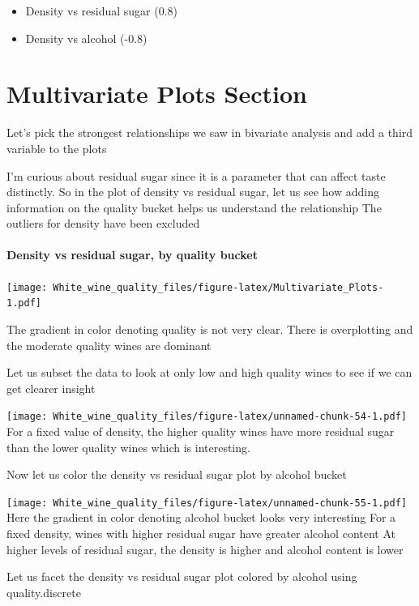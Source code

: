 \documentclass[]{article}
\providecommand{\tightlist}{%
  \setlength{\itemsep}{0pt}\setlength{\parskip}{0pt}}
\let\oldparagraph\paragraph
\renewcommand{\paragraph}[1]{\oldparagraph{#1}\mbox{}}
\begin{document}
\begin{itemize}
\tightlist
\item
  Density vs residual sugar (0.8)
\item
  Density vs alcohol (-0.8)
\end{itemize}

\section{Multivariate Plots Section}\label{multivariate-plots-section}

Let's pick the strongest relationships we saw in bivariate analysis and
add a third variable to the plots

I'm curious about residual sugar since it is a parameter that can affect
taste distinctly. So in the plot of density vs residual sugar, let us
see how adding information on the quality bucket helps us understand the
relationship The outliers for density have been excluded

\paragraph{Density vs residual sugar, by quality
bucket}\label{density-vs-residual-sugar-by-quality-bucket}

\texttt{[image: White\_wine\_quality\_files/figure-latex/Multivariate\_Plots-1.pdf]}

The gradient in color denoting quality is not very clear. There is
overplotting and the moderate quality wines are dominant

Let us subset the data to look at only low and high quality wines to see
if we can get clearer insight

\texttt{[image: White\_wine\_quality\_files/figure-latex/unnamed-chunk-54-1.pdf]}
For a fixed value of density, the higher quality wines have more
residual sugar than the lower quality wines which is interesting.

Now let us color the density vs residual sugar plot by alcohol bucket

\texttt{[image: White\_wine\_quality\_files/figure-latex/unnamed-chunk-55-1.pdf]}
Here the gradient in color denoting alcohol bucket looks very
interesting For a fixed density, wines with higher residual sugar have
greater alcohol content At higher levels of residual sugar, the density
is higher and alcohol content is lower

Let us facet the density vs residual sugar plot colored by alcohol using
quality.discrete
\end{document}
